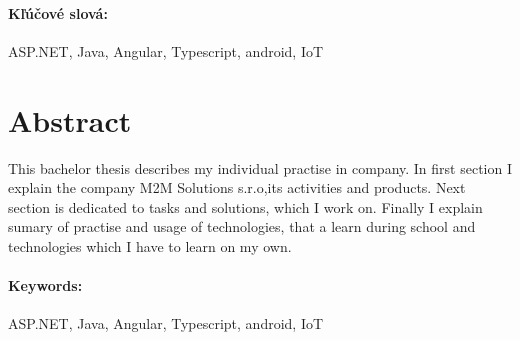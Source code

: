 \documentclass[11pt, oneside]{report}
\begin{document}
\paragraph*{Kľúčové slová:} ASP.NET, Java, Angular, Typescript, android, IoT

\paragraph*{}

\section*{Abstract}
This bachelor thesis describes my individual practise in company. In first section I explain the company  M2M Solutions s.r.o,its activities and products. Next section is dedicated to tasks and solutions, which I work on. Finally I explain sumary of practise and usage of technologies, that a learn during school and technologies which I have to learn on my own.


\paragraph*{Keywords:}  ASP.NET, Java, Angular, Typescript, android, IoT




\newpage 
\tableofcontents



\newpage
\end{document}
